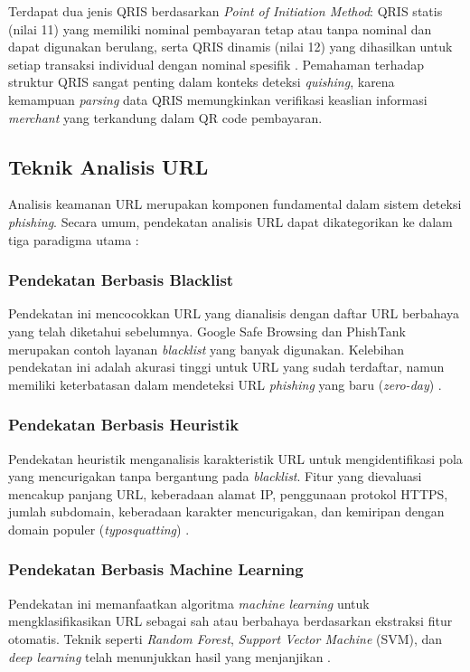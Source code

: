 \documentclass[conference]{IEEEtran}
\begin{document}
Terdapat dua jenis QRIS berdasarkan \textit{Point of Initiation Method}: QRIS statis (nilai 11) yang memiliki nominal pembayaran tetap atau tanpa nominal dan dapat digunakan berulang, serta QRIS dinamis (nilai 12) yang dihasilkan untuk setiap transaksi individual dengan nominal spesifik \cite{bi_qris_2019}. Pemahaman terhadap struktur QRIS sangat penting dalam konteks deteksi \textit{quishing}, karena kemampuan \textit{parsing} data QRIS memungkinkan verifikasi keaslian informasi \textit{merchant} yang terkandung dalam QR code pembayaran.

\subsection{Teknik Analisis URL}

Analisis keamanan URL merupakan komponen fundamental dalam sistem deteksi \textit{phishing}. Secara umum, pendekatan analisis URL dapat dikategorikan ke dalam tiga paradigma utama \cite{sahoo_malicious_2017}:

\subsubsection{Pendekatan Berbasis Blacklist}
Pendekatan ini mencocokkan URL yang dianalisis dengan daftar URL berbahaya yang telah diketahui sebelumnya. Google Safe Browsing dan PhishTank merupakan contoh layanan \textit{blacklist} yang banyak digunakan. Kelebihan pendekatan ini adalah akurasi tinggi untuk URL yang sudah terdaftar, namun memiliki keterbatasan dalam mendeteksi URL \textit{phishing} yang baru (\textit{zero-day}) \cite{google_safebrowsing}.

\subsubsection{Pendekatan Berbasis Heuristik}
Pendekatan heuristik menganalisis karakteristik URL untuk mengidentifikasi pola yang mencurigakan tanpa bergantung pada \textit{blacklist}. Fitur yang dievaluasi mencakup panjang URL, keberadaan alamat IP, penggunaan protokol HTTPS, jumlah subdomain, keberadaan karakter mencurigakan, dan kemiripan dengan domain populer (\textit{typosquatting}) \cite{sahoo_malicious_2017}.

\subsubsection{Pendekatan Berbasis Machine Learning}
Pendekatan ini memanfaatkan algoritma \textit{machine learning} untuk mengklasifikasikan URL sebagai sah atau berbahaya berdasarkan ekstraksi fitur otomatis. Teknik seperti \textit{Random Forest}, \textit{Support Vector Machine} (SVM), dan \textit{deep learning} telah menunjukkan hasil yang menjanjikan \cite{do_phishing_2022}.
\end{document}
